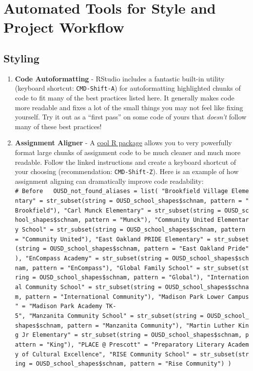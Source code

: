 \documentclass[]{book}
\begin{document}
\section{Automated Tools for Style and Project
Workflow}\label{automated-tools-for-style-and-project-workflow}

\subsection{Styling}\label{styling}

\begin{enumerate}
\def\labelenumi{\arabic{enumi}.}
\item
  \textbf{Code Autoformatting} - RStudio includes a fantastic built-in
  utility (keyboard shortcut: \texttt{CMD-Shift-A}) for autoformatting
  highlighted chunks of code to fit many of the best practices listed
  here. It generally makes code more readable and fixes a lot of the
  small things you may not feel like fixing yourself. Try it out as a
  ``first pass'' on some code of yours that \emph{doesn't} follow many
  of these best practices!
\item
  \textbf{Assignment Aligner} - A
  \href{https://www.r-bloggers.com/align-assign-rstudio-addin-to-align-assignment-operators/}{cool
  R package} allows you to very powerfully format large chunks of
  assignment code to be much cleaner and much more readable. Follow the
  linked instructions and create a keyboard shortcut of your choosing
  (recommendation: \texttt{CMD-Shift-Z}). Here is an example of how
  assignment aligning can dramatically improve code readability:
  \texttt{\#\ Before\ \ \ OUSD\_not\_found\_aliases\ =\ list(\ "Brookfield\ Village\ Elementary"\ =\ str\_subset(string\ =\ OUSD\_school\_shapes\$schnam,\ pattern\ =\ "Brookfield"),\ "Carl\ Munck\ Elementary"\ =\ str\_subset(string\ =\ OUSD\_school\_shapes\$schnam,\ pattern\ =\ "Munck"),\ "Community\ United\ Elementary\ School"\ =\ str\_subset(string\ =\ OUSD\_school\_shapes\$schnam,\ pattern\ =\ "Community\ United"),\ "East\ Oakland\ PRIDE\ Elementary"\ =\ str\_subset(string\ =\ OUSD\_school\_shapes\$schnam,\ pattern\ =\ "East\ Oakland\ Pride"),\ "EnCompass\ Academy"\ =\ str\_subset(string\ =\ OUSD\_school\_shapes\$schnam,\ pattern\ =\ "EnCompass"),\ "Global\ Family\ School"\ =\ str\_subset(string\ =\ OUSD\_school\_shapes\$schnam,\ pattern\ =\ "Global"),\ "International\ Community\ School"\ =\ str\_subset(string\ =\ OUSD\_school\_shapes\$schnam,\ pattern\ =\ "International\ Community"),\ "Madison\ Park\ Lower\ Campus"\ =\ "Madison\ Park\ Academy\ TK-5",\ "Manzanita\ Community\ School"\ =\ str\_subset(string\ =\ OUSD\_school\_shapes\$schnam,\ pattern\ =\ "Manzanita\ Community"),\ "Martin\ Luther\ King\ Jr\ Elementary"\ =\ str\_subset(string\ =\ OUSD\_school\_shapes\$schnam,\ pattern\ =\ "King"),\ "PLACE\ @\ Prescott"\ =\ "Preparatory\ Literary\ Academy\ of\ Cultural\ Excellence",\ "RISE\ Community\ School"\ =\ str\_subset(string\ =\ OUSD\_school\_shapes\$schnam,\ pattern\ =\ "Rise\ Community")\ )}

\end{enumerate}
\end{document}
